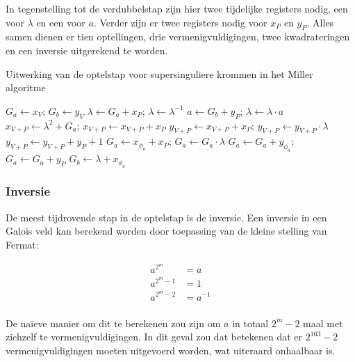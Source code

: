 In tegenstelling tot de verdubbelstap zijn hier twee tijdelijke registers nodig, een voor $\lambda$ en een voor $a$. Verder zijn er twee registers nodig voor $x_P$ en $y_P$. Alles samen dienen er tien optellingen, drie vermenigvuldigingen, twee kwadrateringen en een inversie uitgerekend te worden.

\begin{algorithm}[h]
	\caption{Uitwerking van de optelstap voor supersinguliere krommen in het Miller algoritme}
	\label{algoritme-implementatie-miller-add-detail}
	$G_a \gets x_V$; $G_b \gets y_V$\;
	$\lambda \gets G_a + x_P$; $\lambda \gets \lambda^{-1}$\;
	$a \gets G_b + y_P$; $\lambda \gets \lambda \cdot a$\;
	$x_{V + P} \gets \lambda ^2 + G_a$; $x_{V + P} \gets x_{V + P} + x_P$\;
	$y_{V + P} \gets x_{V + P} + x_P$; $y_{V + P} \gets y_{V + P} \cdot \lambda$\;
	$y_{V + P} \gets y_{V + P} + y_P + 1$\;
	$G_a \gets x_{\phi_a} + x_P$; $G_a \gets G_a \cdot \lambda$\;
	$G_a \gets G_a + y_{\phi_a}$; $G_a \gets G_a + y_P$\;
	$G_b \gets \lambda + x_{\phi_a}$\;
\end{algorithm}

\subsubsection{Inversie}

De meest tijdrovende stap in de optelstap is de inversie.  Een inversie in een Galois veld kan berekend worden door toepassing van de kleine stelling van Fermat:

\[\begin{aligned}
a^{2^m}		&= a\\
a^{2^m - 1}	&= 1\\
a^{2^m - 2}	&= a^{-1}\\
\end{aligned}\]


De na\"ieve manier om dit te berekenen zou zijn om $a$ in totaal $2^m - 2$ maal met zichzelf te vermenigvuldigingen. In dit geval zou dat betekenen dat er $2^{163} - 2$ vermenigvuldigingen moeten uitgevoerd worden, wat uiteraard onhaalbaar is.

